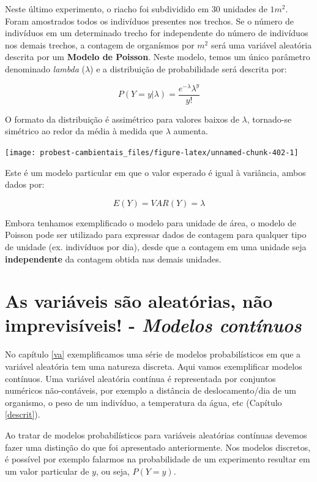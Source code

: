 \documentclass[
]{book}
\begin{document}
Neste último experimento, o riacho foi subdividido em 30 unidades de \(1m^2\). Foram amostrados todos os indivíduos presentes nos trechos. Se o número de indivíduos em um determinado trecho for independente do número de indivíduos nos demais trechos, a contagem de organísmos por \(m^2\) será uma variável aleatória descrita por um \textbf{Modelo de Poisson}. Neste modelo, temos um único parâmetro denominado \emph{lambda} (\(\lambda\)) e a distribuição de probabilidade será descrita por:

\[P(Y = y|\lambda) =  \frac{e^{-\lambda} \lambda^y}{y!}\]

O formato da distribuição é assimétrico para valores baixos de \(\lambda\), tornado-se simétrico ao redor da média à medida que \(\lambda\) aumenta.

\begin{center}\texttt{[image: probest-cambientais\_files/figure-latex/unnamed-chunk-402-1]} \end{center}

Este é um modelo particular em que o valor esperado é igual à variância, ambos dados por:

\[E(Y) = VAR(Y) = \lambda\]

Embora tenhamos exemplificado o modelo para unidade de área, o modelo de Poisson pode ser utilizado para expressar dados de contagem para qualquer tipo de unidade (ex. indivíduos por dia), desde que a contagem em uma unidade seja \textbf{independente} da contagem obtida nas demais unidades.

\hypertarget{vacont}{%
\chapter{\texorpdfstring{As variáveis são aleatórias, não imprevisíveis! - \emph{Modelos contínuos}}{As variáveis são aleatórias, não imprevisíveis! - Modelos contínuos}}\label{vacont}}

No capítulo \ref{va} exemplificamos uma série de modelos probabilísticos em que a variável aleatória tem uma natureza discreta. Aqui vamos exemplificar modelos contínuos. Uma variável aleatória contínua é representada por conjuntos numéricos não-contáveis, por exemplo a distância de deslocamento/dia de um organismo, o peso de um indivíduo, a temperatura da água, etc (Capítulo \ref{descrit}).

Ao tratar de modelos probabilísticos para variáveis aleatórias contínuas devemos fazer uma distinção do que foi apresentado anteriormente. Nos modelos discretos, é possível por exemplo falarmos na probabilidade de um experimento resultar em um valor particular de \(y\), ou seja, \(P(Y = y)\).
\end{document}
